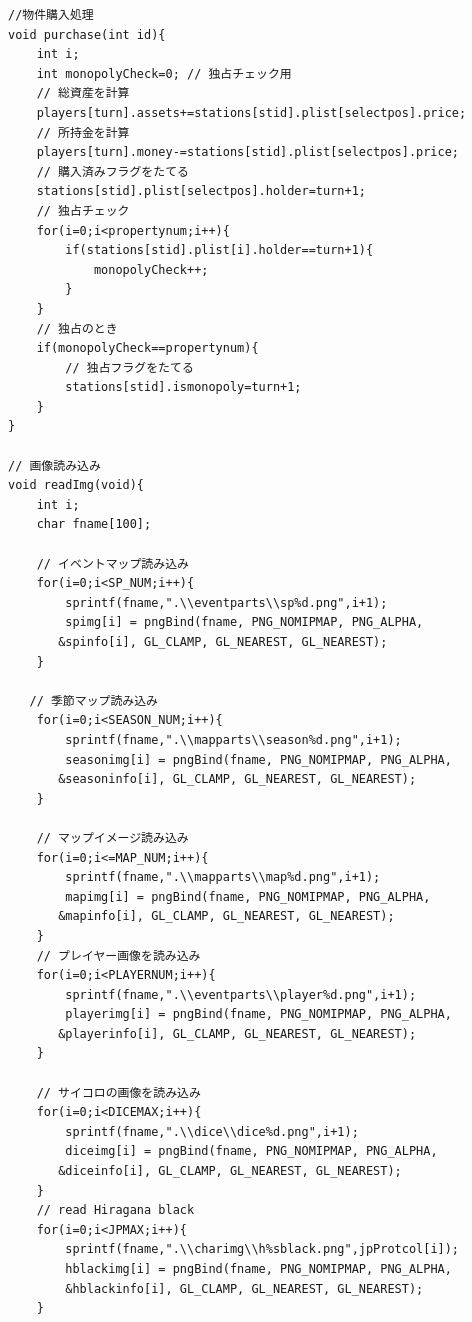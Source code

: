 \documentclass[a4j]{jarticle}
\begin{document}
\begin{lstlisting}[basicstyle=\ttfamily\footnotesize, frame=single,label=code2,caption=game.c]
//物件購入処理
void purchase(int id){
    int i;
    int monopolyCheck=0; // 独占チェック用
    // 総資産を計算
    players[turn].assets+=stations[stid].plist[selectpos].price;
    // 所持金を計算
    players[turn].money-=stations[stid].plist[selectpos].price;
    // 購入済みフラグをたてる
    stations[stid].plist[selectpos].holder=turn+1;    
    // 独占チェック
    for(i=0;i<propertynum;i++){
        if(stations[stid].plist[i].holder==turn+1){
            monopolyCheck++;
        }
    }    
    // 独占のとき
    if(monopolyCheck==propertynum){
        // 独占フラグをたてる
        stations[stid].ismonopoly=turn+1;
    }    
}

// 画像読み込み
void readImg(void){
    int i;
    char fname[100];

    // イベントマップ読み込み
    for(i=0;i<SP_NUM;i++){
        sprintf(fname,".\\eventparts\\sp%d.png",i+1);
        spimg[i] = pngBind(fname, PNG_NOMIPMAP, PNG_ALPHA, 
       &spinfo[i], GL_CLAMP, GL_NEAREST, GL_NEAREST);        
    }

   // 季節マップ読み込み 
    for(i=0;i<SEASON_NUM;i++){
        sprintf(fname,".\\mapparts\\season%d.png",i+1);
        seasonimg[i] = pngBind(fname, PNG_NOMIPMAP, PNG_ALPHA, 
       &seasoninfo[i], GL_CLAMP, GL_NEAREST, GL_NEAREST);        
    }

    // マップイメージ読み込み
    for(i=0;i<=MAP_NUM;i++){
        sprintf(fname,".\\mapparts\\map%d.png",i+1);
        mapimg[i] = pngBind(fname, PNG_NOMIPMAP, PNG_ALPHA, 
       &mapinfo[i], GL_CLAMP, GL_NEAREST, GL_NEAREST);
    }
    // プレイヤー画像を読み込み
    for(i=0;i<PLAYERNUM;i++){
        sprintf(fname,".\\eventparts\\player%d.png",i+1);
        playerimg[i] = pngBind(fname, PNG_NOMIPMAP, PNG_ALPHA, 
       &playerinfo[i], GL_CLAMP, GL_NEAREST, GL_NEAREST);
    }

    // サイコロの画像を読み込み
    for(i=0;i<DICEMAX;i++){
        sprintf(fname,".\\dice\\dice%d.png",i+1);
        diceimg[i] = pngBind(fname, PNG_NOMIPMAP, PNG_ALPHA, 
       &diceinfo[i], GL_CLAMP, GL_NEAREST, GL_NEAREST);
    }
    // read Hiragana black
    for(i=0;i<JPMAX;i++){
        sprintf(fname,".\\charimg\\h%sblack.png",jpProtcol[i]);
        hblackimg[i] = pngBind(fname, PNG_NOMIPMAP, PNG_ALPHA, 
        &hblackinfo[i], GL_CLAMP, GL_NEAREST, GL_NEAREST);
    }


\end{lstlisting}
\end{document}
